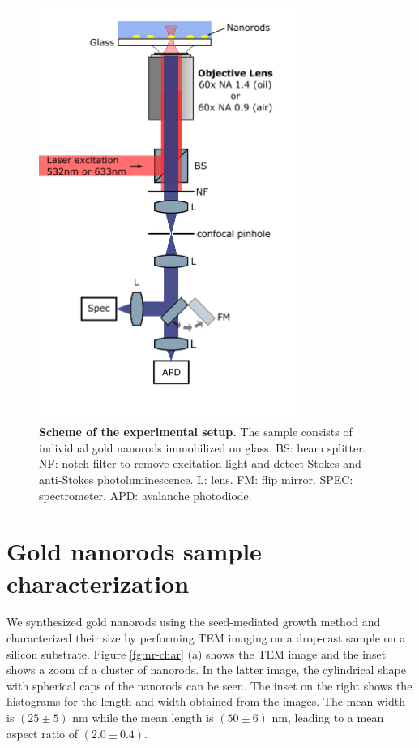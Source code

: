 \documentclass[journal=nalefd,manuscript=letter]{achemso}
\begin{document}
\begin{figure}[htp] \centering
\includegraphics[width=0.75\textwidth]{Figures/Supplementary/02_Setup/setup.png}
\caption{\textbf{Scheme of the experimental setup.} The sample consists of individual gold nanorods immobilized on glass. BS: beam splitter. NF: notch filter to remove excitation light and detect Stokes and anti-Stokes photoluminescence. L: lens. FM: flip mirror. SPEC: spectrometer. APD: avalanche photodiode.}
	\label{fig:setup}
\end{figure}

\pagebreak

\section{Gold nanorods sample characterization}

We synthesized gold nanorods using the seed-mediated growth method \cite{nikoobakht2003preparation} 
and characterized their size by performing TEM imaging on a drop-cast sample on a silicon substrate. 
Figure \ref{fg:nr-char} (a) shows the TEM image and the inset shows a zoom of a cluster of nanorods.
In the latter image, the cylindrical shape with spherical caps of the nanorods can be seen. 
The inset on the right shows the histograms for the length and width obtained from the images.
The mean width %
is $(25 \pm 5)$ nm while the mean length is $(50 \pm 6)$ nm, 
leading to a mean aspect ratio of $(2.0 \pm 0.4)$. 
\end{document}

